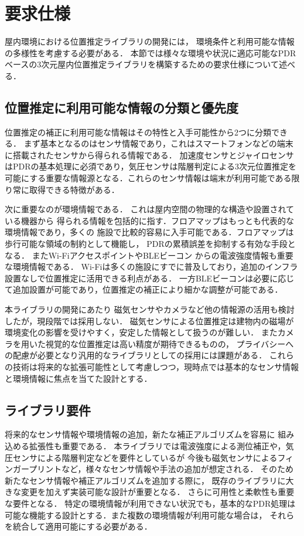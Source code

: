 

\section{要求仕様}

屋内環境における位置推定ライブラリの開発には，
環境条件と利用可能な情報の多様性を考慮する必要がある．
本節では様々な環境や状況に適応可能なPDRベースの3次元屋内位置推定ライブラリを構築するための要求仕様について述べる．

\subsection{位置推定に利用可能な情報の分類と優先度}

位置推定の補正に利用可能な情報はその特性と入手可能性から2つに分類できる．
まず基本となるのはセンサ情報であり，これはスマートフォンなどの端末に搭載されたセンサから得られる情報である．
加速度センサとジャイロセンサはPDRの基本処理に必須であり，気圧センサは階層判定による3次元位置推定を可能にする重要な情報源となる．これらのセンサ情報は端末が利用可能である限り常に取得できる特徴がある．

次に重要なのが環境情報である．
これは屋内空間の物理的な構造や設置されている機器から
得られる情報を包括的に指す．フロアマップはもっとも代表的な環境情報であり，多くの
施設で比較的容易に入手可能である．フロアマップは歩行可能な領域の制約として機能し，
PDRの累積誤差を抑制する有効な手段となる．
またWi-FiアクセスポイントやBLEビーコン
からの電波強度情報も重要な環境情報である．
Wi-Fiは多くの施設にすでに普及しており，追加のインフラ設置なしで位置推定に活用できる利点がある．
一方BLEビーコンは必要に応じて追加設置が可能であり，位置推定の補正により細かな調整が可能である．

本ライブラリの開発にあたり
磁気センサやカメラなど他の情報源の活用も検討したが，現段階では採用しない．
磁気センサによる位置推定は建物内の磁場が環境変化の影響を受けやすく，安定した情報として扱うのが難しい．
またカメラを用いた視覚的な位置推定は高い精度が期待できるものの，
プライバシーへの配慮が必要となり汎用的なライブラリとしての採用には課題がある．
これらの技術は将来的な拡張可能性として考慮しつつ，現時点では基本的なセンサ情報と環境情報に焦点を当てた設計とする．

\subsection{ライブラリ要件}

将来的なセンサ情報や環境情報の追加，新たな補正アルゴリズムを容易に
組み込める拡張性も重要である．
本ライブラリでは電波強度による測位補正や，気圧センサによる階層判定などを要件としているが
今後も磁気センサによるフィンガープリントなど，様々なセンサ情報や手法の追加が想定される．
そのため新たなセンサ情報や補正アルゴリズムを追加する際に，
既存のライブラリに大きな変更を加えず実装可能な設計が重要となる．
さらに可用性と柔軟性も重要な要件となる．
特定の環境情報が利用できない状況でも，基本的なPDR処理は
可能な機能する設計とする．また複数の環境情報が利用可能な場合は，
それらを統合して適用可能にする必要がある．



